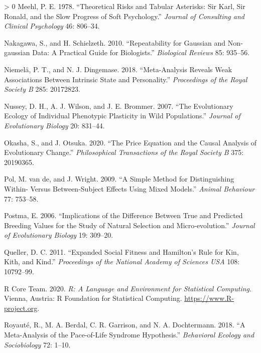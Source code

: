 \documentclass{article}
\newlength{\cslhangindent}
\newenvironment{CSLReferences}[3] %
 {%
  \setlength{\parindent}{0pt}
  \ifodd #1 \everypar{\setlength{\hangindent}{\cslhangindent}}\ignorespaces\fi
  \ifnum #2 > 0
  \setlength{\parskip}{#2\baselineskip}
  \fi
 }%
 {}
\begin{document}
\begin{CSLReferences}{1}{0}
\leavevmode\hypertarget{ref-Meehl1978}{}%
Meehl, P. E. 1978. {``Theoretical Risks and Tabular Asterisks: Sir Karl,
Sir Ronald, and the Slow Progress of Soft Psychology.''} \emph{Journal
of Consulting and Clinical Psychology} 46: 806--34.

\leavevmode\hypertarget{ref-Naka2010}{}%
Nakagawa, S., and H. Schielzeth. 2010. {``Repeatability for Gaussian and
Non‐gaussian Data: A Practical Guide for Biologists.''} \emph{Biological
Reviews} 85: 935--56.

\leavevmode\hypertarget{ref-Niem2018}{}%
Niemelä, P. T., and N. J. Dingemase. 2018. {``Meta-Analysis Reveals Weak
Associations Between Intrinsic State and Personality.''}
\emph{Proceedings of the Royal Society B} 285: 20172823.

\leavevmode\hypertarget{ref-Nus2007}{}%
Nussey, D. H., A. J. Wilson, and J. E. Brommer. 2007. {``The
Evolutionary Ecology of Individual Phenotypic Plasticity in Wild
Populations.''} \emph{Journal of Evolutionary Biology} 20: 831--44.

\leavevmode\hypertarget{ref-Okasha2020}{}%
Okasha, S., and J. Otsuka. 2020. {``The Price Equation and the Causal
Analysis of Evolutionary Change.''} \emph{Philosophical Transactions of
the Royal Society B} 375: 20190365.

\leavevmode\hypertarget{ref-Pol2009}{}%
Pol, M. van de, and J. Wright. 2009. {``A Simple Method for
Distinguishing Within- Versus Between-Subject Effects Using Mixed
Models.''} \emph{Animal Behaviour} 77: 753--58.

\leavevmode\hypertarget{ref-Postma2006}{}%
Postma, E. 2006. {``Implications of the Difference Between True and
Predicted Breeding Values for the Study of Natural Selection and
Micro‐evolution.''} \emph{Journal of Evolutionary Biology} 19: 309--20.

\leavevmode\hypertarget{ref-Queller2011}{}%
Queller, D. C. 2011. {``Expanded Social Fitness and Hamilton's Rule for
Kin, Kith, and Kind.''} \emph{Proceedings of the National Academy of
Sciences USA} 108: 10792--99.

\leavevmode\hypertarget{ref-Rbase}{}%
R Core Team. 2020. \emph{R: A Language and Environment for Statistical
Computing}. Vienna, Austria: R Foundation for Statistical Computing.
\url{https://www.R-project.org}.

\leavevmode\hypertarget{ref-Roy2018}{}%
Royauté, R., M. A. Berdal, C. R. Garrison, and N. A. Dochtermann. 2018.
{``A Meta-Analysis of the Pace-of-Life Syndrome Hypothesis.''}
\emph{Behavioral Ecology and Sociobiology} 72: 1--10.


\end{CSLReferences}
\end{document}
